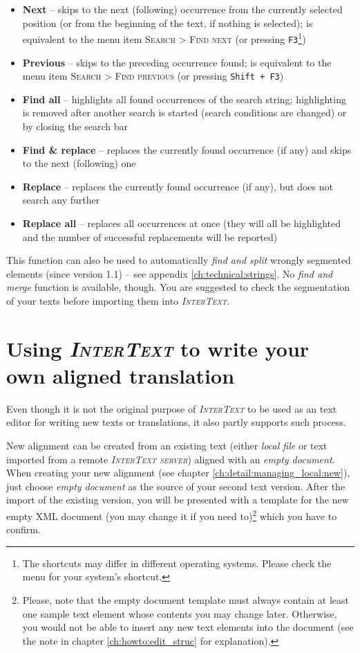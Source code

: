 \documentclass[a4paper,10pt,oneside]{book}
\newcommand{\IT}{\textit{\textsc{InterText}}\xspace}
\newcommand{\ITserver}{\textit{\textsc{InterText server}}\xspace}
\newcommand{\keys}[1]{\texttt{#1}}
\newcommand{\menu}[1]{\textsc{#1}}
\begin{document}
\begin{itemize}
 \item \textbf{Next} -- skips to the next (following) occurrence from the currently selected position (or from the beginning of the text, if nothing is selected); is equivalent to the menu item \menu{Search} > \menu{Find next} (or pressing \keys{F3}\footnote{The shortcuts may differ in different operating systems. Please check the menu for your system's shortcut.})
 \item \textbf{Previous} -- skips to the preceding occurrence found; is equivalent to the menu item \menu{Search} > \menu{Find previous} (or pressing \keys{Shift + F3})
 \item \textbf{Find all} -- highlights all found occurrences of the search string; highlighting is removed after another search is started (search conditions are changed) or by closing the search bar
 \item \textbf{Find \& replace} -- replaces the currently found occurrence (if any) and skips to the next (following) one
 \item \textbf{Replace} -- replaces the currently found occurrence (if any), but does not search any further
 \item \textbf{Replace all} -- replaces all occurrences at once (they will all be highlighted and the number of successful replacements will be reported)
\end{itemize}

This function can also be used to automatically \emph{find and split} wrongly segmented elements (since version 1.1) -- see appendix \ref{ch:technical:strings}. No \emph{find and merge} function is available, though. You are suggested to check the segmentation of your texts before importing them into \IT.

\chapter{Using \IT to write your own aligned translation}\label{ch:detail:translation}

Even though it is not the original purpose of \IT to be used as an text editor for writing new texts or translations, it also partly supports such process.

New alignment can be created from an existing text (either \emph{local file} or text imported from a remote \ITserver) aligned with an \emph{empty document}. When creating your new alignment (see chapter \ref{ch:detail:managing_local:new}), just choose \emph{empty document} as the source of your second text version. After the import of the existing version, you will be presented with a template for the new empty XML document (you may change it if you need to)\footnote{Please, note that the empty document template must always contain at least one sample text element whose contents you may change later. Otherwise, you would not be able to insert any new text elements into the document (see the note in chapter \ref{ch:howto:edit_struc} for explanation).} which you have to confirm.
\end{document}
